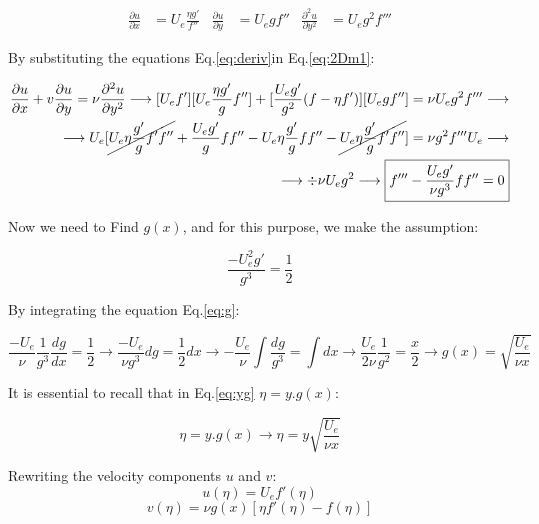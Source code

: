 \documentclass[]{report}
\begin{document}
\begin{align}
\label{eq:deriv}
    \frac{\partial u}{\partial x} &= U_e \frac{\eta g'}{f''} 
    &
    \frac{\partial u}{\partial y} &= U_e gf''
    &
    \frac{\partial^2u}{\partial y^2} &= U_e g^2 f'''
\end{align}

By substituting the equations Eq.\ref{eq:deriv}in  Eq.\ref{eq:2Dm1}:

\begin{equation}
\begin{split}
   \frac{\partial u}{\partial x} + v\frac{\partial u}{\partial y}=\nu\frac{\partial^2u}{\partial y^2}  \longrightarrow [U_e f'][U_e\frac{\eta g'}{g}f''] + [\frac{U_eg'}{g^2}(f-\eta f')][U_e g f''] = \nu U_e g^2 f''' \longrightarrow \\
\longrightarrow  U_e[\cancel{U_e \eta \frac{g'}{g} f'f''} + \frac{U_e g'}{g}ff'' - U_e\eta \frac{g'}{g}ff'' - \cancel{U_e \eta \frac{g'}{g} f'f''}] = \nu g^2 f''' U_e \longrightarrow \\
\longrightarrow \div \nu U_e g^2  \longrightarrow  \boxed{f''' - \frac{U_e g'}{\nu g^3}ff'' = 0}
\end{split}
\end{equation}

Now we need to Find $g(x)$, and for this purpose, we make the assumption:

\begin{equation}
\label{eq:g}
    \frac{-U_e^2g'}{g^3} = \frac{1}{2}
\end{equation}

By integrating the equation Eq.\ref{eq:g}:

\begin{equation}
        \frac{-U_e}{\nu}\frac{1}{g^3}\frac{dg}{dx} = \frac{1}{2} \longrightarrow \frac{-U_e}{\nu g^3}dg = \frac{1}{2}dx  \longrightarrow -\frac{U_e}{\nu}\int \frac{dg}{g^3} = \int dx \longrightarrow \frac{U_e}{2\nu}\frac{1}{g^2} = \frac{x}{2} \longrightarrow   \boxed{g(x) = \sqrt{\frac{U_e}{\nu x}}}   
\end{equation}

It is essential to recall that in Eq.\ref{eq:yg} $\eta=y.g(x)$:

\begin{equation}
    \eta = y.g(x) \longrightarrow \eta = y\sqrt{\frac{U_e}{\nu x}}
\end{equation}

Rewriting the velocity components $u$ and $v$:
\begin{equation}
    u(\eta) = U_e f'(\eta)
\end{equation}
\begin{equation}
    v(\eta) = \nu g(x) [\eta f'(\eta) - f(\eta)]
\end{equation}
\end{document}
